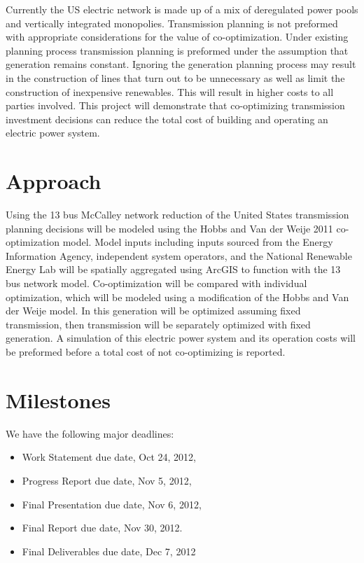 \documentclass[12pt,letterpaper]{article}
\theoremstyle{definition}
\begin{document}
Currently the US electric network is made up of a mix of deregulated power pools and vertically integrated monopolies. Transmission planning is not preformed with appropriate considerations for the value of co-optimization. Under existing planning process transmission planning is preformed under the assumption that generation remains constant. Ignoring the generation planning process may result in the construction of lines that turn out to be unnecessary as well as limit the construction of inexpensive renewables. This will result in higher costs to all parties involved. This project will demonstrate that co-optimizing transmission investment decisions can reduce the total cost of building and operating an electric power system. 

\section{Approach}
Using the 13 bus McCalley network reduction of the United States transmission planning decisions will be modeled using the Hobbs and Van der Weije 2011 co-optimization model.\cite{Hobbs, PSERC} Model inputs including inputs sourced from the Energy Information Agency, independent system operators, and the National Renewable Energy Lab will be spatially aggregated using ArcGIS to function with the 13 bus network model.
Co-optimization will be compared with individual optimization, which will be modeled using a modification of the Hobbs and Van der Weije model. In this generation will be optimized assuming fixed transmission, then transmission will be separately optimized with fixed generation. A simulation of this electric power system and its operation costs will be preformed before a total cost of not co-optimizing is reported.
\section{Milestones}
We have the following major deadlines:
\begin{itemize}
    \item Work Statement due date, Oct 24, 2012,
    \item Progress Report due date, Nov 5, 2012,
    \item Final Presentation due date, Nov 6, 2012,
    \item Final Report due date, Nov 30, 2012.
    \item Final Deliverables due date, Dec 7, 2012
\end{itemize}
\end{document}
